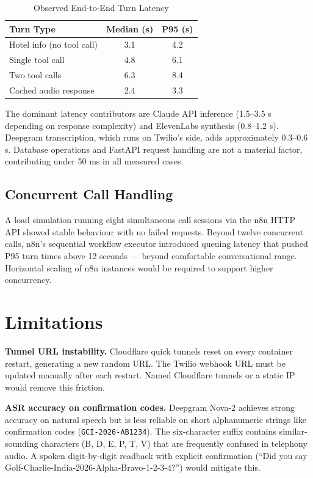 \documentclass[conference]{IEEEtran}
\begin{document}
\begin{table}[!h]
\caption{Observed End-to-End Turn Latency}
\label{tab:latency}
\centering
\scriptsize
\begin{tabular}{@{}lcc@{}}
\toprule
\textbf{Turn Type} & \textbf{Median (s)} & \textbf{P95 (s)} \\
\midrule
Hotel info (no tool call)   & 3.1 & 4.2 \\
Single tool call            & 4.8 & 6.1 \\
Two tool calls              & 6.3 & 8.4 \\
Cached audio response       & 2.4 & 3.3 \\
\bottomrule
\end{tabular}
\end{table}

The dominant latency contributors are Claude API inference (1.5–3.5 s depending
on response complexity) and ElevenLabs synthesis (0.8–1.2 s). Deepgram
transcription, which runs on Twilio's side, adds approximately 0.3–0.6 s.
Database operations and FastAPI request handling are not a material factor,
contributing under 50 ms in all measured cases.

\subsection{Concurrent Call Handling}

A load simulation running eight simultaneous call sessions via the n8n HTTP
API showed stable behaviour with no failed requests. Beyond twelve concurrent
calls, n8n's sequential workflow executor introduced queuing latency that
pushed P95 turn times above 12 seconds — beyond comfortable conversational
range. Horizontal scaling of n8n instances would be required to support
higher concurrency.


\section{Limitations}
\label{sec:limits}

\textbf{Tunnel URL instability.} Cloudflare quick tunnels reset on every
container restart, generating a new random URL. The Twilio webhook URL must
be updated manually after each restart. Named Cloudflare tunnels or a static
IP would remove this friction.

\textbf{ASR accuracy on confirmation codes.} Deepgram Nova-2 achieves strong
accuracy on natural speech but is less reliable on short alphanumeric strings
like confirmation codes (\texttt{GCI-2026-AB1234}). The six-character suffix
contains similar-sounding characters (B, D, E, P, T, V) that are frequently
confused in telephony audio. A spoken digit-by-digit readback with explicit
confirmation (``Did you say Golf-Charlie-India-2026-Alpha-Bravo-1-2-3-4?'')
would mitigate this.
\end{document}

